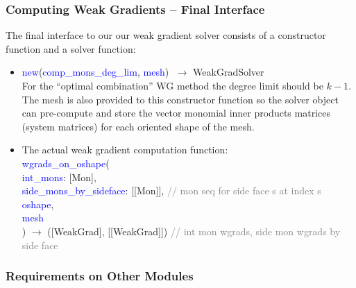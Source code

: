 \documentclass[compress]{beamer}
\begin{document}
\begin{frame}
  \frametitle{Computing Weak Gradients -- Final Interface}
  The final interface to our our weak gradient solver consists of a constructor function and a solver function:\\ 
  \pause
  \begin{itemize}[<+->]
    \item  \textcolor{blue}{new}(\textcolor{blue}{comp\_mons\_deg\_lim}, \textcolor{blue}{mesh}) $\; \rightarrow$ {\small WeakGradSolver}\\
      For the ``optimal combination'' WG method the degree limit should be $k-1$.
      The mesh is also provided to this constructor function so the solver object can pre-compute and store the vector monomial
      inner products matrices (system matrices) for each oriented shape of the mesh.
    \item The actual weak gradient computation function:\\
      \textcolor{blue}{wgrads\_on\_oshape}(\\
      \hspace{.5cm} \textcolor{blue}{int\_mons}: [Mon],\\
      \hspace{.5cm} \textcolor{blue}{side\_mons\_by\_sideface}: [[Mon]], \textcolor{gray}{\scriptsize // mon seq for side face s at index s}\\
      \hspace{.5cm} \textcolor{blue}{oshape},\\
      \hspace{.5cm} \textcolor{blue}{mesh}\\
      ) $\rightarrow$ {\scriptsize ([WeakGrad], [[WeakGrad]])} \textcolor{gray}{\scriptsize // int mon wgrads, side mon wgrads by side face}
  \end{itemize}
\end{frame}

\subsubsection{Requirements on Other Modules}
\end{document}
